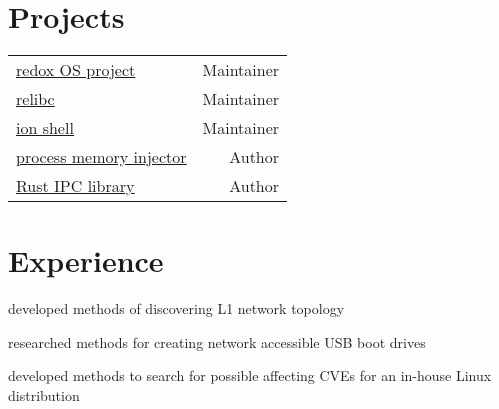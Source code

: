 \documentclass[a4paper]{style}
\begin{document}
\begin{minipage}[t]{0.54\textwidth} %


\section{Projects}
\begin{tabular}{lr}
    \href{https://redox-os.org/}{\color{blue}\underline{\color{blue}redox OS project}} & Maintainer \\
    \href{https://gitlab.redox-os.org/redox-os/relibc}{\color{blue}\underline{\color{blue}relibc}} & Maintainer \\
    \href{https://gitlab.redox-os.org/redox-os/ion}{\color{blue}\underline{\color{blue}ion shell}} & Maintainer \\
    \href{https://github.com/Tommoa/rs-process-memory}{\color{blue}\underline{\color{blue}process memory injector}} & Author \\
    \href{https://github.com/Tommoa/rs-ipc}{\color{blue}\underline{\color{blue}Rust IPC library}} & Author
\end{tabular}

\sectionspace{}


\section{Experience}


\vspace{7pt}
\begin{tightitemize}
\item developed methods of discovering L1 network topology
\item researched methods for creating network accessible USB boot drives
\item developed methods to search for possible affecting CVEs for an in-house Linux distribution
\end{tightitemize}
\sectionspace{} %


\end{minipage}
\end{document}
